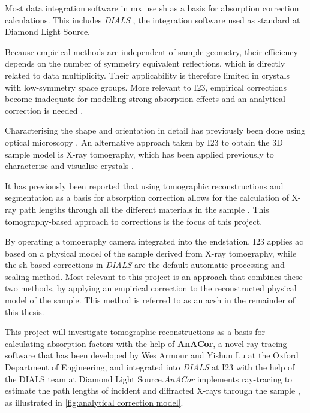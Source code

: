 Most data integration software in \ac{mx} use \ac{sh} as a basis for absorption correction calculations. This includes \textit{DIALS} \cite{Winter2018}, the integration software used as standard at Diamond Light Source.

Because empirical methods are independent of sample geometry, their efficiency depends on the number of symmetry equivalent reflections, which is directly related to data multiplicity. Their applicability is therefore limited in crystals with low-symmetry space groups. More relevant to I23, empirical corrections become inadequate for modelling strong absorption effects %
and an analytical correction is needed \cite{Kazantsev2021}.

Characterising the shape and orientation in detail has previously been done using optical microscopy \cite{Leal2008, Strutz2011}. %
An alternative approach taken by I23 to obtain the 3D sample model is X-ray tomography, which has been applied previously to characterise and visualise crystals \cite{Merrifield2011, Warren2013}.%

 It has previously been reported that using tomographic reconstructions and segmentation as a basis for absorption correction allows for the calculation of X-ray path lengths through all the different materials in the sample \cite{Brockhauser2008}. This tomography-based approach to corrections is the focus of this project.

By operating a tomography camera integrated into the endstation, I23 applies \ac{ac} based on a physical model of the sample derived from X-ray tomography, while the \ac{sh}-based corrections in \textit{DIALS} are the default automatic processing and scaling method. Most relevant to this project is an approach that combines these two methods, by applying an empirical correction to the reconstructed physical model of the sample. This method is referred to as an \ac{acsh} in the remainder of this thesis. %

This project will investigate tomographic reconstructions as a basis for calculating absorption factors with the help of \textbf{AnACor}, a novel ray-tracing software that has been developed by Wes Armour and Yishun Lu at the Oxford Department of Engineering, and integrated into \textit{DIALS} at I23 with the help of the DIALS team at Diamond Light Source.\textit{AnACor} implements ray-tracing to estimate the path lengths of incident and diffracted X-rays through the sample \cite{Lu2024}, as illustrated in \cref{fig:analytical correction model}.

